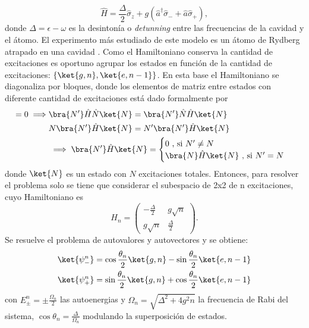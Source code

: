 \begin{equation}\label{ec3:hamiltoniano jcm}
    \hat H=\frac{\Delta}{2}\hat\sigma_z+g(\hat a^\dagger \hat\sigma_-+\hat a \hat\sigma_+),
\end{equation} 
donde $\Delta = \epsilon - \omega$ es la desintonía o \textit{detunning} entre las frecuencias de la cavidad y el átomo. El experimento más estudiado de este modelo es un átomo de Rydberg atrapado en una cavidad \cite{Haroche2006}. Como el Hamiltoniano conserva la cantidad de excitaciones es oportuno agrupar los estados en funci\'on de la cantidad de excitaciones: $\{\ket{g,n},\ket{e,n-1}\}$. En esta base el Hamiltoniano se diagonaliza por bloques, donde los elementos de matriz entre estados con diferente cantidad de excitaciones está dado formalmente por
\begin{align*}
    [\hat H,\hat N]=0 \implies & \bra{N'}\hat H \hat N \ket{N} = \bra{N'}\hat N \hat H \ket{N} \\
    & N \bra{N'}\hat H  \ket{N} = N' \bra{N'}\hat H \ket{N} \\
    & \implies \bra{N'}\hat H \ket{N} = \begin{cases}
        0 \text{ , si } N' \neq N \\
        \bra{N}\hat H \ket{N} \text{ , si } N'=N
    \end{cases}
\end{align*}
donde $\ket{N}$ es un estado con $N$ excitaciones totales. Entonces, para resolver el problema solo se tiene que considerar el subespacio de 2x2 de n excitaciones, cuyo Hamiltoniano es
\begin{equation}
    H_n=\begin{pmatrix}
        -\frac{\Delta}{2} & g \sqrt{n} \\
        g \sqrt{n} & \frac{\Delta}{2} 
    \end{pmatrix}.
\end{equation}
Se resuelve el problema de autovalores y autovectores y se obtiene:
\begin{equation}
    \begin{aligned}
        \ket{\psi^n_-} & = \cos \frac{\theta_n}{2}\ket{g,n}-\sin \frac{\theta_n}{2}\ket{e,n-1} \\
        \ket{\psi^n_+} & = \sin \frac{\theta_n}{2}\ket{g,n}+\cos \frac{\theta_n}{2}\ket{e,n-1}        
    \end{aligned}
\end{equation}
con $E_{\pm}^n=\pm \frac{\Omega_n}{2}$ las autoenergias y $\Omega_n=\sqrt{\Delta^2+4g^2n}$ la frecuencia de Rabi del sistema, $\cos \theta_n=\frac{\Delta}{\Omega_n}$ modulando la superposici\'on de estados. 
